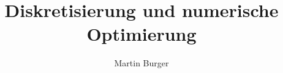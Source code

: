 \usepackage[T1]{fontenc}
\usepackage{lmodern}
\author{Martin Burger}
\title{Diskretisierung und numerische Optimierung}
\setpdfinfo %

\usepackage{styles/fau-colors}
\usepackage[thmboxing=styleA,
			boxingstyle=styleA,
			chapterheader=styleA, 
			footerheader=styleA,
			]{styles/fau-appearence}
\usepackage{styles/fau-symbols}
%
\usepackage{kantlipsum}
\usepackage[totoc]{idxlayout}